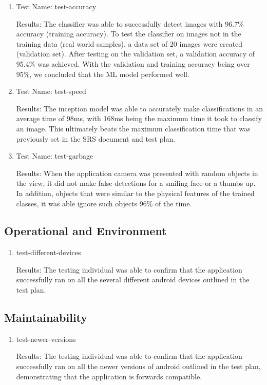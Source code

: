 \documentclass[12pt, titlepage]{article}
\begin{document}
\begin{enumerate}
    \item{Test Name: test-accuracy}
    
    Results: The classifier was able to successfully detect images with 96.7\% accuracy (training accuracy). To test the classifier on images not in the training data (real world samples), a data set of 20 images were created (validation set). After testing on the validation set, a validation accuracy of 95.4\% was achieved. With the validation and training accuracy being over 95\%, we concluded that the ML model performed well.\\

    
    \item {Test Name: test-speed}
    
    Results: The inception model was able to accurately make classifications in an average time of 98ms, with 168ms being the maximum time it took to classify an image. This ultimately beats the maximum classification time that was previously set in the SRS document and test plan.\\
    
    \item{Test Name: test-garbage}
    
    Results: When the application camera was presented with random objects in the view, it did not make false detections for a smiling face or a thumbs up. In addition, objects that were similar to the physical features of the trained classes, it was able ignore such objects 96\% of the time. \\
\end{enumerate}

\subsection{Operational and Environment}
\begin{enumerate}
    \item{test-different-devices}
    
    Results: The testing individual was able to confirm that the application successfully ran on all the several different android devices outlined in the test plan.

\end{enumerate}

\subsection{Maintainability}
\begin{enumerate}
    \item{test-newer-versions}
    
    Results: The testing individual was able to confirm that the application successfully ran on all the newer versions of android outlined in the test plan, demonstrating that the application is forwards compatible.

\end{enumerate}
\end{document}
